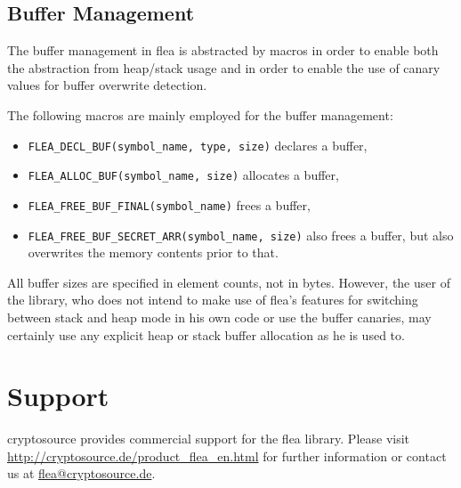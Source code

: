 \documentclass[a4paper,11pt]{scrartcl}
\begin{document}
\subsection{Buffer Management}
The buffer management in flea is abstracted by macros in order to enable both
the abstraction from heap/stack usage and in order to enable the use of canary
values for buffer overwrite detection.

The following  macros are mainly employed for the buffer management:
\begin{itemize}
  \item \verb#FLEA_DECL_BUF(symbol_name, type, size)# declares a buffer, 
  \item \verb#FLEA_ALLOC_BUF(symbol_name, size)# allocates a buffer, 
  \item \verb#FLEA_FREE_BUF_FINAL(symbol_name)# frees a buffer,
  \item \verb#FLEA_FREE_BUF_SECRET_ARR(symbol_name, size)# also frees a buffer,
    but also overwrites the memory contents prior to that.
\end{itemize}
All buffer sizes are specified in element counts, not in bytes. However, the
user of the library, who does not intend to make use of flea's features for 
switching between stack and heap mode in his own code or use the buffer
canaries, may certainly use any explicit heap or stack buffer allocation as he
is used to.



\section{Support}
cryptosource provides commercial support for the flea library. Please visit
\url{http://cryptosource.de/product_flea_en.html} for further information or
contact us at \url{flea@cryptosource.de}.
\end{document}
